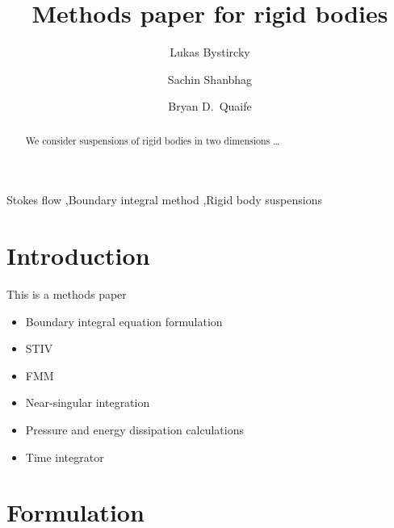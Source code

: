 \documentclass[preprint, 10pt]{elsarticle}
\begin{document}
\title{Methods paper for rigid bodies}

\author[Lukas]{Lukas Bystircky}
\author[Lukas]{Sachin Shanbhag}
\author[Bryan]{Bryan D.~Quaife}
\address[Lukas]{Department of Scientific Computing, Florida State University,
Tallahassee, FL, 32306.}
\address[Bryan]{Department of Scientific Computing and Geophysical Fluid
Dynamics Institute, Florida State University, Tallahassee, FL, 32306.}

\begin{abstract} 
We consider suspensions of rigid bodies in two dimensions \ldots
\end{abstract}

\begin{keyword}
  Stokes flow \sep Boundary integral method \sep Rigid body suspensions 
\end{keyword}

\maketitle





\section{Introduction\label{s:intro}}


This is a methods paper
\begin{itemize}
  \item Boundary integral equation formulation
  \item STIV
  \item FMM
  \item Near-singular integration
  \item Pressure and energy dissipation calculations
  \item Time integrator
\end{itemize}




\section{Formulation\label{s:formulation}} 
\end{document}
